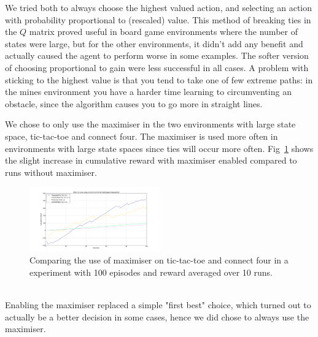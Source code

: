 We tried both to always choose
the highest valued action, and selecting an action with probability proportional
to (rescaled) value. This method of breaking ties in the $Q$ matrix proved useful
in board game environments  where the number of states were large, but for the
other environments, it didn't add any benefit and actually caused the agent to
perform worse in some examples. The softer version of choosing proportional to
gain were less successful in all cases. A problem with sticking to the highest
value is that you tend to take one of few extreme paths: in the mines
environment you have a harder time learning to circumventing an obstacle, since
the algorithm causes you to go more in straight lines.



We chose to only use the maximiser in the two environments with large state space, tic-tac-toe and connect four. The maximiser is used more often in environments with large state spaces since ties will occur more often. Fig~\ref{fig:tiemaximiser} shows the slight increase in cumulative reward with maximiser enabled compared to runs without maximiser.
\begin{figure}[h]
    \centering
    \includegraphics[width=0.5\textwidth]{../data/tiebreakerplotconnectfourtictactoe.png}
    \caption{Comparing the use of maximiser on tic-tac-toe and connect four in a experiment with 100 episodes and reward averaged over 10 runs. }
    \label{fig:tiemaximiser}
\end{figure}\\
Enabling the maximiser replaced a simple "first best" choice, which turned out to actually be a better decision in some cases, hence we did chose to always use the maximiser.

